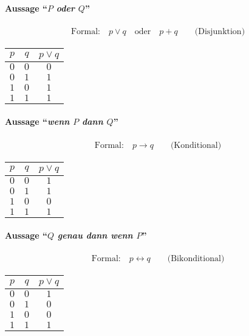 \paragraph{Aussage ``\textit{$P$ oder $Q$}''}
\begin{gather*}
	\text{Formal:} \quad p\vee q\quad\text{oder}\quad p+q\qquad\text{(Disjunktion)}
\end{gather*}
\begin{center}
	\begin{tabular}{cc|c}
		\hline
		$p$ & $q$ & $p\vee q$ \\
		\hline
		$0$ & $0$ & $0$ \\
		$0$ & $1$ & $1$ \\
		$1$ & $0$ & $1$ \\
		$1$ & $1$ & $1$ \\
	\end{tabular}
\end{center}

\paragraph{Aussage ``\textit{wenn $P$ dann $Q$}''}
\begin{gather*}
	\text{Formal:} \quad p\rightarrow q\qquad\text{(Konditional)}
\end{gather*}
\begin{center}
	\begin{tabular}{cc|c}
		\hline
		$p$ & $q$ & $p\vee q$ \\
		\hline
		$0$ & $0$ & $1$ \\
		$0$ & $1$ & $1$ \\
		$1$ & $0$ & $0$ \\
		$1$ & $1$ & $1$ \\
	\end{tabular}
\end{center}

\paragraph{Aussage ``\textit{$Q$ genau dann wenn $P$}''}
\begin{gather*}
	\text{Formal:} \quad p\leftrightarrow q\qquad\text{(Bikonditional)}
\end{gather*}
\begin{center}
	\begin{tabular}{cc|c}
		\hline
		$p$ & $q$ & $p\vee q$ \\
		\hline
		$0$ & $0$ & $1$ \\
		$0$ & $1$ & $0$ \\
		$1$ & $0$ & $0$ \\
		$1$ & $1$ & $1$ \\
	\end{tabular}
\end{center}

